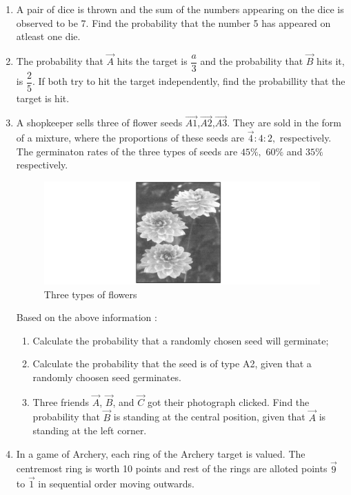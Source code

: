 \begin{enumerate}
\item A pair of dice is thrown and the sum of the numbers appearing on the dice is observed to be 7. Find the probability that the number 5 has appeared on atleast one die.
\item The probability that $\vec{A}$ hits the target is $\dfrac{a}{3}$ and the probability that $\vec{B}$ hits it, is $\dfrac{2}{5}.$ If both try to hit the target independently, find the probabillity that the target is hit. 
\item A shopkeeper sells three of flower seeds $\vec{A1}$,$\vec{A2}$,$\vec{A3}.$ They are sold in the form of a mixture, where the proportions of these seeds are $\vec{4} : {4} : {2},$ respectively. The germinaton rates of the three types of seeds are $45\%,$ $60\%$ and $35\%$ respectively.
\begin{figure}[!ht]
\centering                                                                                        \includegraphics[width=\columnwidth]{figs/flowers}                                                \caption{Three types of flowers}                      
\label{fig:flowers11}                                                                             
\end{figure}
Based on  the above information :
\begin{enumerate}
\item  Calculate the probability that a randomly chosen seed will germinate;
\item  Calculate the probability  that the seed is of type A2, given that a randomly choosen seed germinates.
\item Three friends $\vec{A}$, $\vec{B}$, and $\vec{C}$ got their photograph clicked. Find the probability that $\vec{B}$ is standing at the central position, given that $\vec{A}$  is standing at the left corner.
\end{enumerate}
\item In a game of Archery, each ring of the Archery target is valued. The centremost ring is worth 10 points and rest of the rings are alloted points $\vec{9}$ to $\vec{1}$ in sequential order moving outwards.

\end{enumerate}
